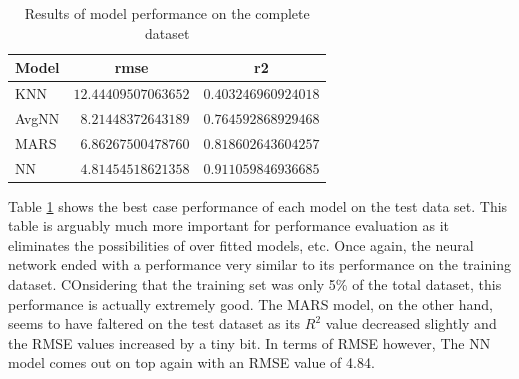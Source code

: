 \documentclass[letterpaper,12pt,titlepage,oneside,final]{report}
\begin{document}
            \begin{table}[!hp]
                \begin{center}
                \begin{tabular}{lrr}
                \hline\hline
                \multicolumn{1}{l}{Model}&\multicolumn{1}{c}{rmse}&\multicolumn{1}{c}{r2}\tabularnewline
                \hline
                KNN&$12.44409507063652$&$0.403246960924018$\tabularnewline
                AvgNN&$ 8.21448372643189$&$0.764592868929468$\tabularnewline
                MARS&$ 6.86267500478760$&$0.818602643604257$\tabularnewline
                NN&$ 4.81454518621358$&$0.911059846936685$\tabularnewline
                \hline
                \end{tabular}
                \caption{Results of model performance on the complete dataset}
                \label{test-res}
                \end{center}
            \end{table}
            Table \ref{test-res} shows the best case performance of each model on the test data set. This table is arguably much more important for performance evaluation as it eliminates the possibilities of over fitted models, etc. Once again, the neural network ended with a performance very similar to its performance on the training dataset. COnsidering that the training set was only 5\% of the total dataset, this performance is actually extremely good. The MARS model, on the other hand, seems to have faltered on the test dataset as its $R^2$ value decreased slightly and the RMSE values increased by a tiny bit. In terms of RMSE however, The NN model comes out on top again with an RMSE value of 4.84. 
\end{document}
